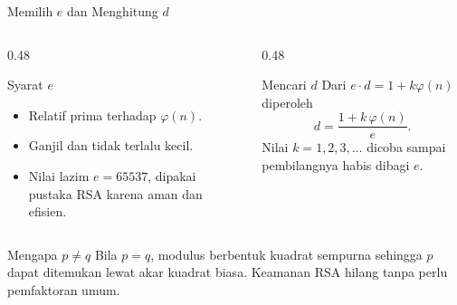 \documentclass[aspectratio=169,11pt]{beamer}
\begin{document}
\begin{frame}{Memilih $e$ dan Menghitung $d$}
    \footnotesize
    \begin{columns}[T,onlytextwidth]
        \begin{column}{0.48\textwidth}
            \begin{block}{Syarat $e$}
                \begin{itemize}
                    \item Relatif prima terhadap $\varphi(n)$.
                    \item Ganjil dan tidak terlalu kecil.
                    \item Nilai lazim $e = 65537$, dipakai pustaka RSA
                          karena aman dan efisien.
                \end{itemize}
            \end{block}
        \end{column}
        \begin{column}{0.48\textwidth}
            \begin{block}{Mencari $d$}
                Dari $e \cdot d = 1 + k\varphi(n)$ diperoleh
                \[
                    d = \frac{1 + k\,\varphi(n)}{e}.
                \]
                Nilai $k = 1, 2, 3, \dots$ dicoba sampai pembilangnya habis
                dibagi $e$.
            \end{block}
        \end{column}
    \end{columns}
    \vspace{0.1cm}
    \begin{exampleblock}{Mengapa $p \neq q$}
        \footnotesize
        Bila $p = q$, modulus berbentuk kuadrat sempurna sehingga $p$ dapat
        ditemukan lewat akar kuadrat biasa. Keamanan RSA hilang tanpa perlu
        pemfaktoran umum.
    \end{exampleblock}
\end{frame}
\end{document}
